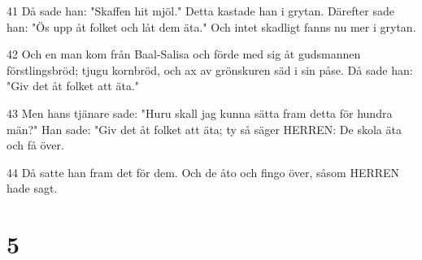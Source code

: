 \par 41 Då sade han: "Skaffen hit mjöl." Detta kastade han i grytan. Därefter sade han: "Ös upp åt folket och låt dem äta." Och intet skadligt fanns nu mer i grytan.
\par 42 Och en man kom från Baal-Salisa och förde med sig åt gudsmannen förstlingsbröd; tjugu kornbröd, och ax av grönskuren säd i sin påse. Då sade han: "Giv det åt folket att äta."
\par 43 Men hans tjänare sade: "Huru skall jag kunna sätta fram detta för hundra män?" Han sade: "Giv det åt folket att äta; ty så säger HERREN: De skola äta och få över.
\par 44 Då satte han fram det för dem. Och de åto och fingo över, såsom HERREN hade sagt.

\chapter{5}

